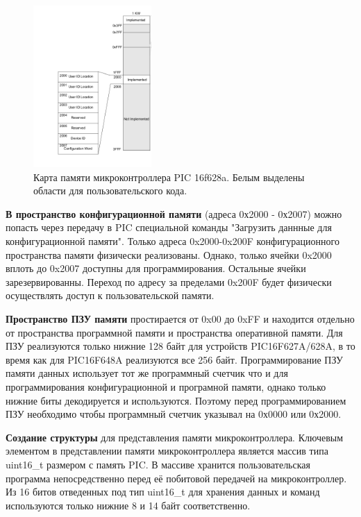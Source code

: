 \begin{figure}[h!]
    \centering
    \includegraphics[width=0.4\textwidth]{2017-05-08_at_02:27:50_screenshot.png}
    \caption{Карта памяти микроконтроллера PIC 16f628a. Белым выделены области для пользовательского кода.}
\end{figure}

\textbf{В пространство конфигурационной памяти}
(адреса 0х2000 - 0х2007) можно попасть через передачу в PIC специальной команды 
"Загрузить даннные для конфигурационной памяти". Только адреса 0x2000-0x200F 
конфигурационного пространства памяти физически реализованы. Однако, только 
ячейки 0x2000 вплоть до 0x2007 доступны для программирования. Остальные ячейки
зарезервированны. Переход по адресу за пределами 0x200F будет физически осуществлять
доступ к пользовательской памяти.

\textbf{Пространство ПЗУ памяти}
простирается от 0x00 до 0xFF и находится отдельно от пространства программной памяти
и пространства оперативной памяти. Для ПЗУ реализуются только нижние 128 байт
для устройств PIC16F627A/628A, в то время как для PIC16F648A
реализуются все 256 байт. Программирование ПЗУ памяти данных использует тот же программный счетчик
что и для программирования конфигурационной и програмной памяти, однако только нижние биты
декодируется и используются. Поэтому перед программированием ПЗУ необходимо чтобы 
программный счетчик указывал на 0х0000 или 0х2000.

\textbf{Создание структуры} для представления памяти микроконтроллера. 
Ключевым элементом в представлении памяти микроконтроллера является массив 
типа uint16\_t размером с память PIC. В массиве хранится пользовательская программа 
непосредственно перед её побитовой передачей на микроконтроллер. Из 16 битов отведенных под тип uint16\_t для 
хранения данных и команд используются только нижние 8 и 14 байт соответственно.


